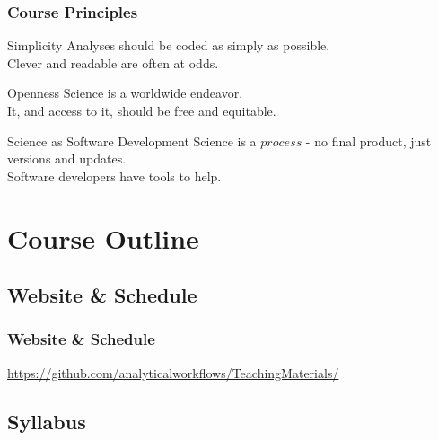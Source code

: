 \documentclass{beamer}
\begin{document}
\begin{frame}

    \frametitle{Course Principles}

        \begin{block}{Simplicity}
            Analyses should be coded as simply as possible.\\Clever and readable are often at odds.
        \end{block}

        \begin{block}{Openness}
            Science is a worldwide endeavor.\\It, and access to it, should be free and equitable.
        \end{block}

        \begin{block}{Science as Software Development}
            Science is a $process$ - no final product, just versions and updates.\\Software developers have tools to help.
        \end{block}


\end{frame}

\section{Course Outline}


\subsection{Website \& Schedule}

\begin{frame}
    \frametitle{Website \& Schedule}
    \small{    \url{https://github.com/analyticalworkflows/TeachingMaterials/} }

\end{frame}


\subsection{Syllabus}
\end{document}
